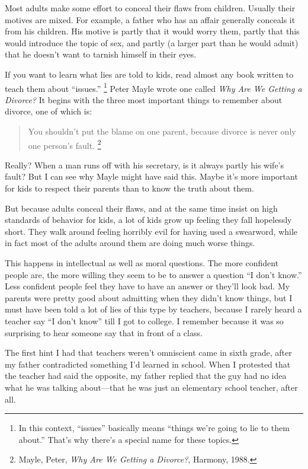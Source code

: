 Most adults make some effort to conceal their flaws from children.
Usually their motives are mixed. For example, a father who has an affair
generally conceals it from his children. His motive is partly that it
would worry them, partly that this would introduce the topic of sex, and
partly (a larger part than he would admit) that he doesn't want to
tarnish himself in their eyes.

If you want to learn what lies are told to kids, read almost any book
written to teach them about ``issues.'' \footnote{In this context, ``issues'' basically means ``things we're going
to lie to them about.'' That's why there's a special name for these
topics.} Peter
Mayle wrote one called \emph{Why Are We Getting a Divorce?} It begins
with the three most important things to remember about divorce, one of
which is:

\begin{quote}
You shouldn't put the blame on one parent, because divorce is never only
one person's fault. \footnote{Mayle, Peter, \emph{Why Are We Getting a Divorce?}, Harmony,
1988.}
\end{quote}

Really? When a man runs off with his secretary, is it always partly his
wife's fault? But I can see why Mayle might have said this. Maybe it's
more important for kids to respect their parents than to know the truth
about them.

But because adults conceal their flaws, and at the same time insist on
high standards of behavior for kids, a lot of kids grow up feeling they
fall hopelessly short. They walk around feeling horribly evil for having
used a swearword, while in fact most of the adults around them are doing
much worse things.

This happens in intellectual as well as moral questions. The more
confident people are, the more willing they seem to be to answer a
question ``I don't know.'' Less confident people feel they have to have
an answer or they'll look bad. My parents were pretty good about
admitting when they didn't know things, but I must have been told a lot
of lies of this type by teachers, because I rarely heard a teacher say
``I don't know'' till I got to college. I remember because it was so
surprising to hear someone say that in front of a class.

The first hint I had that teachers weren't omniscient came in sixth
grade, after my father contradicted something I'd learned in school.
When I protested that the teacher had said the opposite, my father
replied that the guy had no idea what he was talking about---that he was
just an elementary school teacher, after all.


